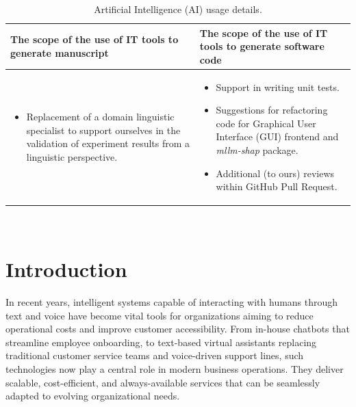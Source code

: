 \begin{table}[htbp]
    \caption*{Artificial Intelligence (AI) usage details.}
    \centering
    \renewcommand{\arraystretch}{1.4}
    \begin{tabularx}{\textwidth}{@{} >{\raggedright\arraybackslash}X >{\raggedright\arraybackslash}X @{}}
        \toprule
        \textbf{The scope of the use of IT tools to generate manuscript} & \textbf{The scope of the use of IT tools to generate software code} \\
        \midrule
        \begin{itemize}[leftmargin=*, nosep, topsep=0pt, before=\vspace{-\baselineskip}]
            \item Replacement of a domain linguistic specialist to support ourselves in the validation of experiment results from a linguistic perspective.
        \end{itemize} &
        \begin{itemize}[leftmargin=*, nosep, topsep=0pt, before=\vspace{-\baselineskip}]
            \item Support in writing unit tests.
            \item Suggestions for refactoring code for Graphical User Interface (GUI) frontend and \textit{mllm-shap} package.
            \item Additional (to ours) reviews within GitHub Pull Request.
        \end{itemize} \\
        \bottomrule
    \end{tabularx}
\end{table}

\newpage \ \null\thispagestyle{empty}\newpage

\chapter{Introduction}
\label{sec:introduction}

In recent years, intelligent systems capable of interacting with humans through text and voice have become vital tools for organizations aiming to reduce operational costs and improve customer accessibility. From in-house chatbots that streamline employee onboarding, to text-based virtual assistants replacing traditional customer service teams and voice-driven support lines, such technologies now play a central role in modern business operations. They deliver scalable, cost-efficient, and always-available services that can be seamlessly adapted to evolving organizational needs.

